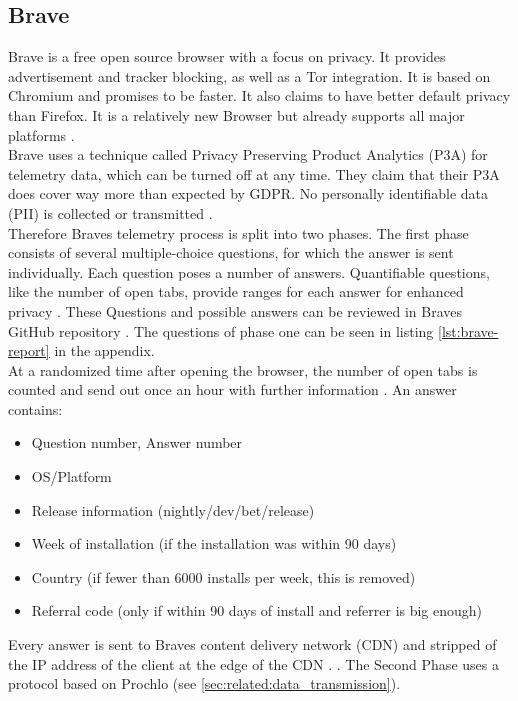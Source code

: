     \subsection{Brave}
        Brave is a free open source browser with a focus on privacy. It provides advertisement and tracker blocking, as well as a Tor integration. It is based on Chromium and promises to be faster. It also claims to have better default privacy than Firefox. It is a relatively new Browser but already supports all major platforms \cite{brave_secure_nodate}.\\
        Brave uses a technique called Privacy Preserving Product Analytics (P3A) for telemetry data, which can be turned off at any time.
        They claim that their P3A does cover way more than expected by GDPR. No personally identifiable data (PII) is collected or transmitted \cite{brave_privacy-preserving_2019}.\\
        Therefore Braves telemetry process is split into two phases. The first phase consists of several multiple-choice questions, for which the answer is sent individually.
        Each question poses a number of answers. Quantifiable questions, like the number of open tabs, provide ranges for each answer for enhanced privacy \cite{brave_privacy-preserving_2019}. These Questions and possible answers can be reviewed in Braves GitHub repository \cite{brave_software_inc_brave-browser_2019}.
        The questions of phase one can be seen in listing \ref{lst:brave-report} in the appendix.\\
        At a randomized time after opening the browser, the number of open tabs is counted and send out once an hour with further information \cite{brave_privacy-preserving_2019}.
        An answer contains:
        \begin{itemize}
            \item Question number, Answer number
            \item OS/Platform
            \item Release information (nightly/dev/bet/release)
            \item Week of installation (if the installation was within 90 days)
            \item Country (if fewer than 6000 installs per week, this is removed)
            \item Referral code (only if within 90 days of install and referrer is big enough)
        \end{itemize}
        Every answer is sent to Braves content delivery network (CDN) and stripped of the IP address of the client at the edge of the CDN \cite{brave_privacy-preserving_2019}.
        . 
        The Second Phase uses a protocol based on Prochlo (see \ref{sec:related:data_transmission}). 
        
